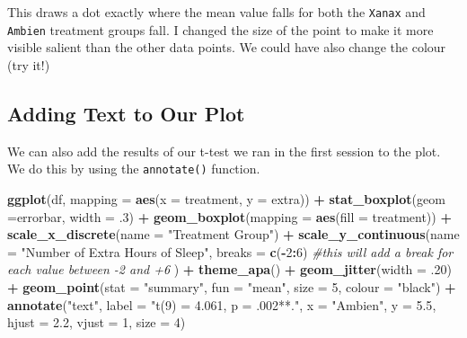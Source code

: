 \documentclass[
]{book}
\newenvironment{Shaded}{\begin{snugshade}}{\end{snugshade}}
\newcommand{\AttributeTok}[1]{\textcolor[rgb]{0.13,0.29,0.53}{#1}}
\newcommand{\CommentTok}[1]{\textcolor[rgb]{0.56,0.35,0.01}{\textit{#1}}}
\newcommand{\DecValTok}[1]{\textcolor[rgb]{0.00,0.00,0.81}{#1}}
\newcommand{\FloatTok}[1]{\textcolor[rgb]{0.00,0.00,0.81}{#1}}
\newcommand{\FunctionTok}[1]{\textcolor[rgb]{0.13,0.29,0.53}{\textbf{#1}}}
\newcommand{\NormalTok}[1]{#1}
\newcommand{\SpecialCharTok}[1]{\textcolor[rgb]{0.81,0.36,0.00}{\textbf{#1}}}
\newcommand{\StringTok}[1]{\textcolor[rgb]{0.31,0.60,0.02}{#1}}
\begin{document}
This draws a dot exactly where the mean value falls for both the \texttt{Xanax} and \texttt{Ambien} treatment groups fall. I changed the size of the point to make it more visible salient than the other data points. We could have also change the colour (try it!)

\hypertarget{adding-text-to-our-plot}{%
\subsection{Adding Text to Our Plot}\label{adding-text-to-our-plot}}

We can also add the results of our t-test we ran in the first session to the plot. We do this by using the \texttt{annotate()} function.

\begin{Shaded}
\begin{Highlighting}[]
\FunctionTok{ggplot}\NormalTok{(df, }\AttributeTok{mapping =} \FunctionTok{aes}\NormalTok{(}\AttributeTok{x =}\NormalTok{ treatment, }\AttributeTok{y =}\NormalTok{ extra)) }\SpecialCharTok{+} 
  \FunctionTok{stat\_boxplot}\NormalTok{(}\AttributeTok{geom =}\StringTok{\textquotesingle{}errorbar\textquotesingle{}}\NormalTok{, }\AttributeTok{width =}\NormalTok{ .}\DecValTok{3}\NormalTok{) }\SpecialCharTok{+}
  \FunctionTok{geom\_boxplot}\NormalTok{(}\AttributeTok{mapping =} \FunctionTok{aes}\NormalTok{(}\AttributeTok{fill =}\NormalTok{ treatment)) }\SpecialCharTok{+} 
  \FunctionTok{scale\_x\_discrete}\NormalTok{(}\AttributeTok{name =} \StringTok{"Treatment Group"}\NormalTok{) }\SpecialCharTok{+} 
  \FunctionTok{scale\_y\_continuous}\NormalTok{(}\AttributeTok{name =} \StringTok{"Number of Extra Hours of Sleep"}\NormalTok{, }
                     \AttributeTok{breaks =} \FunctionTok{c}\NormalTok{(}\SpecialCharTok{{-}}\DecValTok{2}\SpecialCharTok{:}\DecValTok{6}\NormalTok{) }\CommentTok{\#this will add a break for each value between {-}2 and +6}
\NormalTok{                     ) }\SpecialCharTok{+}
  \FunctionTok{theme\_apa}\NormalTok{() }\SpecialCharTok{+}
  \FunctionTok{geom\_jitter}\NormalTok{(}\AttributeTok{width =}\NormalTok{ .}\DecValTok{20}\NormalTok{) }\SpecialCharTok{+}
  \FunctionTok{geom\_point}\NormalTok{(}\AttributeTok{stat =} \StringTok{"summary"}\NormalTok{, }\AttributeTok{fun =} \StringTok{"mean"}\NormalTok{, }\AttributeTok{size =} \DecValTok{5}\NormalTok{, }\AttributeTok{colour =} \StringTok{"black"}\NormalTok{) }\SpecialCharTok{+} 
  \FunctionTok{annotate}\NormalTok{(}\StringTok{"text"}\NormalTok{,}
           \AttributeTok{label =} \StringTok{"t(9) = 4.061, p = .002**."}\NormalTok{,}
           \AttributeTok{x =} \StringTok{"Ambien"}\NormalTok{, }
           \AttributeTok{y =} \FloatTok{5.5}\NormalTok{, }
           \AttributeTok{hjust =} \FloatTok{2.2}\NormalTok{, }
           \AttributeTok{vjust =} \DecValTok{1}\NormalTok{, }
           \AttributeTok{size =} \DecValTok{4}\NormalTok{)}
\end{Highlighting}
\end{Shaded}
\end{document}
